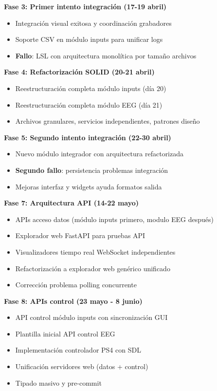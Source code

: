 \textbf{Fase 3: Primer intento integración (17-19 abril)}
\begin{itemize}
    \item Integración visual exitosa y coordinación grabadores
    \item Soporte CSV en módulo inputs para unificar logs
    \item \textbf{Fallo}: LSL con arquitectura monolítica por tamaño archivos
\end{itemize}

\textbf{Fase 4: Refactorización SOLID (20-21 abril)}
\begin{itemize}
    \item Reestructuración completa módulo inputs (día 20)
    \item Reestructuración completa módulo EEG (día 21)
    \item Archivos granulares, servicios independientes, patrones diseño
\end{itemize}

\textbf{Fase 5: Segundo intento integración (22-30 abril)}
\begin{itemize}
    \item Nuevo módulo integrador con arquitectura refactorizada
    \item \textbf{Segundo fallo}: persistencia problemas integración
    \item Mejoras interfaz y widgets ayuda formatos salida
\end{itemize}

\textbf{Fase 7: Arquitectura API (14-22 mayo)}
\begin{itemize}
    \item APIs acceso datos (módulo inputs primero, modulo EEG después)
    \item Explorador web FastAPI para pruebas API
    \item Visualizadores tiempo real WebSocket independientes
    \item Refactorización a explorador web genérico unificado
    \item Corrección problema polling concurrente
\end{itemize}

\textbf{Fase 8: APIs control (23 mayo - 8 junio)}
\begin{itemize}
    \item API control módulo inputs con sincronización GUI
    \item Plantilla inicial API control EEG
    \item Implementación controlador PS4 con SDL
    \item Unificación servidores web (datos + control)
    \item Tipado masivo y pre-commit
\end{itemize}

